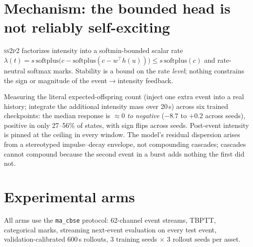 \documentclass[11pt]{article}
\newcommand{\ssppp}{\textsc{ss2p2}}
\begin{document}
\section{Mechanism: the bounded head is not reliably self-exciting}
\label{sec:mechanism}
\ssppp{} factorizes intensity into a softmin-bounded scalar rate
$\lambda(t)=s\,\mathrm{softplus}\!\big(c-\mathrm{softplus}(c-w^{\top}h(u))\big)
\le s\,\mathrm{softplus}(c)$ and rate-neutral softmax marks. Stability is a
bound on the rate \emph{level}; nothing constrains the sign or magnitude of
the event$\to$intensity feedback.

Measuring the literal expected-offspring count (inject one extra event into a
real history; integrate the additional intensity mass over 20\,s) across six
trained checkpoints: the median response is $\approx 0$ \emph{to negative}
($-8.7$ to $+0.2$ across seeds), positive in only 27--56\% of states, with
sign flips across seeds. Post-event intensity is pinned at the ceiling in
every window. The model's residual dispersion arises from a stereotyped
impulse--decay envelope, not compounding cascades; cascades cannot compound
because the second event in a burst adds nothing the first did not.

\section{Experimental arms}
All arms use the \texttt{ma\_cbse} protocol: 62-channel event streams, TBPTT,
categorical marks, streaming next-event evaluation on every test event,
validation-calibrated 600\,s rollouts, 3 training seeds $\times$ 3 rollout
seeds per asset.
\end{document}
